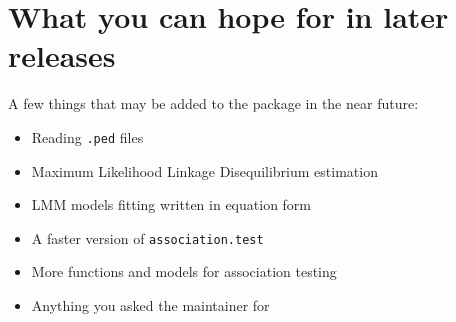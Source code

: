 \documentclass{article}
\begin{document}
\section{What you can hope for in later releases}

A few things that may be added to the package in the near future:

\begin{itemize}
\item Reading \verb!.ped! files
\item Maximum Likelihood Linkage Disequilibrium estimation
\item LMM models fitting written in equation form
\item A faster version of \verb!association.test!
\item More functions and models for association testing
\item Anything you asked the maintainer for
\end{itemize}
\end{document}
